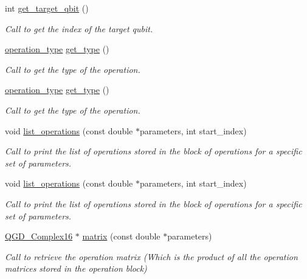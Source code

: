 \begin{DoxyCompactItemize}
int \hyperlink{class_operation_a55eee2ad4b90be085b1ec2ce018502f8}{get\+\_\+target\+\_\+qbit} ()
\begin{DoxyCompactList}\small\item\em Call to get the index of the target qubit. \end{DoxyCompactList}\item 
\hyperlink{operations_2include_2_operation_8h_ad99e62941c8e4b13e5fc45ecaaf65eff}{operation\+\_\+type} \hyperlink{class_operation_acc601a7a00616fd6e2a61f61e084afac}{get\+\_\+type} ()
\begin{DoxyCompactList}\small\item\em Call to get the type of the operation. \end{DoxyCompactList}\item 
\hyperlink{operations_2include_2_operation_8h_ad99e62941c8e4b13e5fc45ecaaf65eff}{operation\+\_\+type} \hyperlink{class_operation_acc601a7a00616fd6e2a61f61e084afac}{get\+\_\+type} ()
\begin{DoxyCompactList}\small\item\em Call to get the type of the operation. \end{DoxyCompactList}\item 
void \hyperlink{class_operation__block_a29e2c74d7fa7344193a17e39248eb803}{list\+\_\+operations} (const double $\ast$parameters, int start\+\_\+index)
\begin{DoxyCompactList}\small\item\em Call to print the list of operations stored in the block of operations for a specific set of parameters. \end{DoxyCompactList}\item 
void \hyperlink{class_operation__block_a29e2c74d7fa7344193a17e39248eb803}{list\+\_\+operations} (const double $\ast$parameters, int start\+\_\+index)
\begin{DoxyCompactList}\small\item\em Call to print the list of operations stored in the block of operations for a specific set of parameters. \end{DoxyCompactList}\item 
\hyperlink{struct_q_g_d___complex16}{Q\+G\+D\+\_\+\+Complex16} $\ast$ \hyperlink{class_operation__block_a43cdb87a4ee2a339de30c94cc94fa40e}{matrix} (const double $\ast$parameters)
\begin{DoxyCompactList}\small\item\em Call to retrieve the operation matrix (Which is the product of all the operation matrices stored in the operation block) \end{DoxyCompactList}\item 

\end{DoxyCompactItemize}
